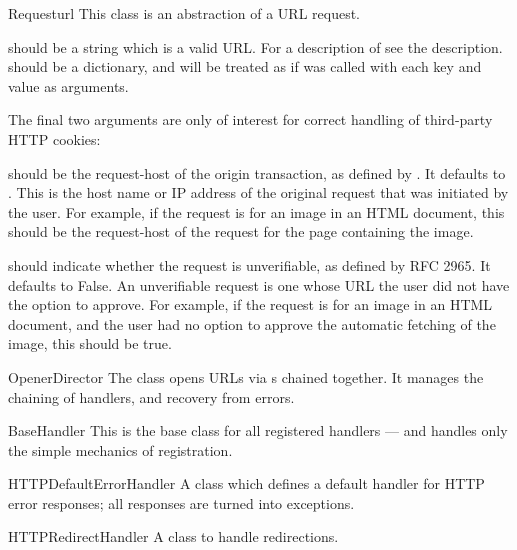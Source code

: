 \begin{classdesc}{Request}{url
    }
This class is an abstraction of a URL request.

 should be a string which is a valid URL.  For a description
of  see the  description.
 should be a dictionary, and will be treated as if
 was called with each key and value as arguments.

The final two arguments are only of interest for correct handling of
third-party HTTP cookies:

 should be the request-host of the origin
transaction, as defined by .  It defaults to
.  This is the host name or IP
address of the original request that was initiated by the user.  For
example, if the request is for an image in an HTML document, this
should be the request-host of the request for the page containing the
image.

 should indicate whether the request is
unverifiable, as defined by RFC 2965.  It defaults to False.  An
unverifiable request is one whose URL the user did not have the option
to approve.  For example, if the request is for an image in an HTML
document, and the user had no option to approve the automatic fetching
of the image, this should be true.
\end{classdesc}

\begin{classdesc}{OpenerDirector}{}
The  class opens URLs via s
chained together. It manages the chaining of handlers, and recovery
from errors.
\end{classdesc}

\begin{classdesc}{BaseHandler}{}
This is the base class for all registered handlers --- and handles only
the simple mechanics of registration.
\end{classdesc}

\begin{classdesc}{HTTPDefaultErrorHandler}{}
A class which defines a default handler for HTTP error responses; all
responses are turned into  exceptions.
\end{classdesc}

\begin{classdesc}{HTTPRedirectHandler}{}
A class to handle redirections.
\end{classdesc}

